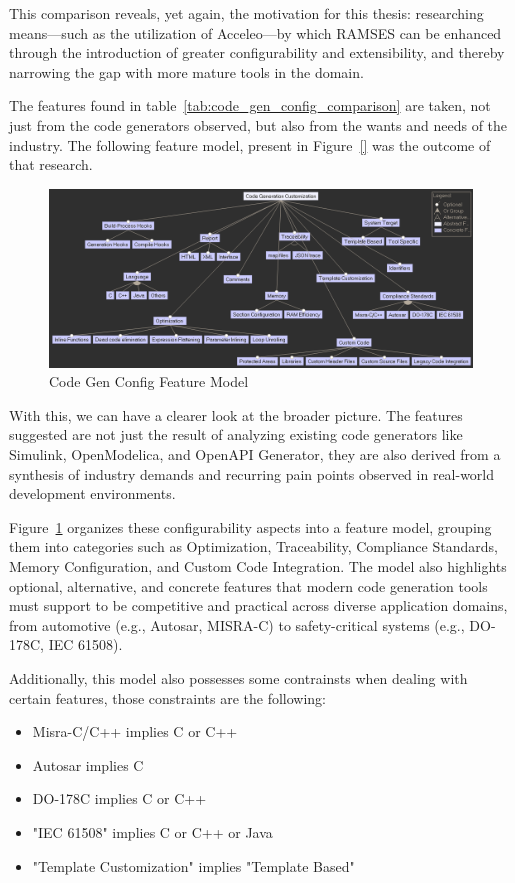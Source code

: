 This comparison reveals, yet again, the motivation for this thesis: researching means—such as the utilization of Acceleo—by which RAMSES can be enhanced through the introduction of greater configurability and extensibility, and thereby narrowing the gap with more mature tools in the domain.

The features found in table~\ref{tab:code_gen_config_comparison} are taken, not just from the code generators observed, but also from the wants and needs of the industry. The following feature model, present in Figure~\ref{} was the outcome of that research.

\begin{figure}[htbp]
	\centering
	\includegraphics[height=0.4\textwidth]{featureModel.png}
	\caption{Code Gen Config Feature Model}
	\label{fig:feature_model}
\end{figure}

With this, we can have a clearer look at the broader picture. The features suggested are not just the result of analyzing existing code generators like Simulink, OpenModelica, and OpenAPI Generator, they are also derived from a synthesis of industry demands and recurring pain points observed in real-world development environments.

Figure~\ref{fig:feature_model} organizes these configurability aspects into a feature model, grouping them into categories such as Optimization, Traceability, Compliance Standards, Memory Configuration, and Custom Code Integration. The model also highlights optional, alternative, and concrete features that modern code generation tools must support to be competitive and practical across diverse application domains, from automotive (e.g., Autosar, MISRA-C) to safety-critical systems (e.g., DO-178C, IEC 61508).

Additionally, this model also possesses some contrainsts when dealing with certain features, those constraints are the following:

\begin{itemize} 
	\item Misra-C/C++ implies C or C++
	\item Autosar implies C
	\item DO-178C implies C or C++
	\item "IEC 61508" implies C or C++ or Java
	\item "Template Customization" implies "Template Based"
\end{itemize}

